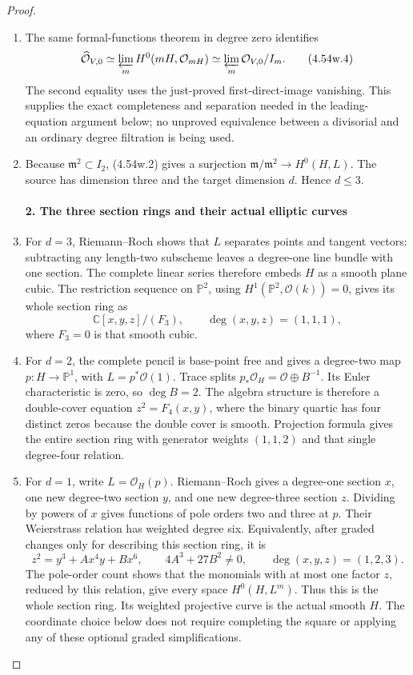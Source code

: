 \begin{proof}
\begin{enumerate}[label={$\langle1\rangle$\arabic*.},leftmargin=*]
\item The same formal-functions theorem in degree zero identifies
\[
 \widehat{\mathcal O}_{V,0}
      \simeq\varprojlim_m H^0(mH,\mathcal O_{mH})
      \simeq\varprojlim_m\mathcal O_{V,0}/I_m.          \tag{4.54w.4}
\]
The second equality uses the just-proved first-direct-image
vanishing. This supplies the exact completeness and separation
needed in the leading-equation argument below; no unproved equivalence between a
divisorial and an ordinary degree filtration is being used.

\item Because \(\mathfrak m^2\subset I_2\), (4.54w.2) gives a
surjection
\(\mathfrak m/\mathfrak m^2\to H^0(H,L)\).
The source has dimension three and the target dimension \(d\).
Hence \(d\le3\).

\paragraph{2. The three section rings and their actual elliptic curves}

\item For \(d=3\), Riemann--Roch shows that \(L\) separates
points and tangent vectors: subtracting any length-two
subscheme leaves a degree-one line bundle with one section.
The complete linear series therefore embeds \(H\) as a smooth
plane cubic. The restriction sequence on \(\mathbb P^2\),
using \(H^1(\mathbb P^2,\mathcal O(k))=0\), gives its whole
section ring as
\[
 \mathbb C[x,y,z]/(F_3),\qquad \deg(x,y,z)=(1,1,1),
\]
where \(F_3=0\) is that smooth cubic.

\item For \(d=2\), the complete pencil is base-point free and gives
a degree-two map \(p:H\to\mathbb P^1\), with
\(L=p^*\mathcal O(1)\). Trace splits
\(p_*\mathcal O_H=\mathcal O\oplus B^{-1}\).
Its Euler characteristic is zero, so \(\deg B=2\).
The algebra structure is therefore a double-cover equation
\(z^2=F_4(x,y)\), where the binary quartic has four distinct
zeros because the double cover is smooth. Projection formula
gives the entire section ring with generator weights
\((1,1,2)\) and that single degree-four relation.

\item For \(d=1\), write \(L=\mathcal O_H(p)\).
Riemann--Roch gives a degree-one section \(x\), one new
degree-two section \(y\), and one new degree-three section
\(z\). Dividing by powers of \(x\) gives functions of pole
orders two and three at \(p\). Their Weierstrass relation
has weighted degree six. Equivalently, after graded changes
only for describing this section ring, it is
\[
 z^2=y^3+A x^4y+B x^6,
 \qquad 4A^3+27B^2\ne0,
 \qquad\deg(x,y,z)=(1,2,3).
\]
The pole-order count shows that the monomials with at most one
factor \(z\), reduced by this relation, give every space
\(H^0(H,L^m)\). Thus this is the whole section ring. Its
weighted projective curve is the actual smooth \(H\).
The coordinate choice below does not require completing the
square or applying any of these optional graded simplifications.


\end{enumerate}
\end{proof}
